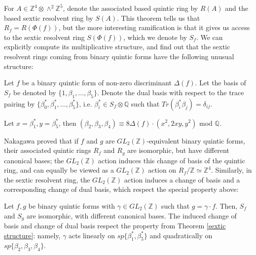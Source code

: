 \documentclass{article}
\begin{document}
For $A \in \mathbb{Z}^4 \otimes \wedge^2 \mathbb{Z}^5$, denote the associated based quintic ring by $R(A)$ and the based sextic resolvent ring by $S(A)$.  This theorem tells us that $R_f = R(\Phi(f))$, but the more interesting ramification is that it gives us access to the sextic resolvent ring $S(\Phi(f))$, which we denote by $S_f$.  We can explicitly compute its multiplicative structure, and find out that the sextic resolvent rings coming from binary quintic forms have the following unusual structure:

\begin{theorem} \label{sextic structure}
Let $f$ be a binary quintic form of non-zero discriminant $\Delta(f)$.  Let the basis of $S_f$ be denoted by $\{1,\beta_1,\ldots,\beta_5\}$.  Denote the dual basis with respect to the trace pairing by $\{\beta_0^*,\beta_1^*,\ldots,\beta_5^*\}$, i.e. $\beta_i^* \in S_f \otimes \mathbb{Q}$ such that $Tr(\beta_i^* \beta_j) = \delta_{ij}$.

Let $x = \beta_1^*, y = \beta_5^*$, then $(\beta_2,\beta_3,\beta_4) \equiv 8 \Delta(f) \cdot ( x^2, 2 x y, y^2 )$ mod $\mathbb{Q}$.
\end{theorem}

Nakagawa proved that if $f$ and $g$ are $GL_2(\mathbb{Z})$-equivalent binary quintic forms, their associated quintic rings $R_f$ and $R_g$ are isomorphic, but have different canonical bases; the $GL_2(\mathbb{Z})$ action induces this change of basis of the quintic ring, and can equally be viewed as a $GL_2(\mathbb{Z})$ action on $R_f / \mathbb{Z} \simeq \mathbb{Z}^4$.  Similarly, in the sextic resolvent ring, the $GL_2(\mathbb{Z})$ action induces a change of basis and a corresponding change of dual basis, which respect the special property above:
\begin{theorem}
Let $f,g$ be binary quintic forms with $\gamma \in GL_2(\mathbb{Z})$ such that $g = \gamma \cdot f$.  Then, $S_f$ and $S_g$ are isomorphic, with different canonical bases.  The induced change of basis and change of dual basis respect the property from Theorem \ref{sextic structure}: namely, $\gamma$ acts linearly on $sp \{\beta_1^*, \beta_5^*\}$ and quadratically on $sp \{\beta_2,\beta_3,\beta_4\}$.
\end{theorem}
\end{document}
